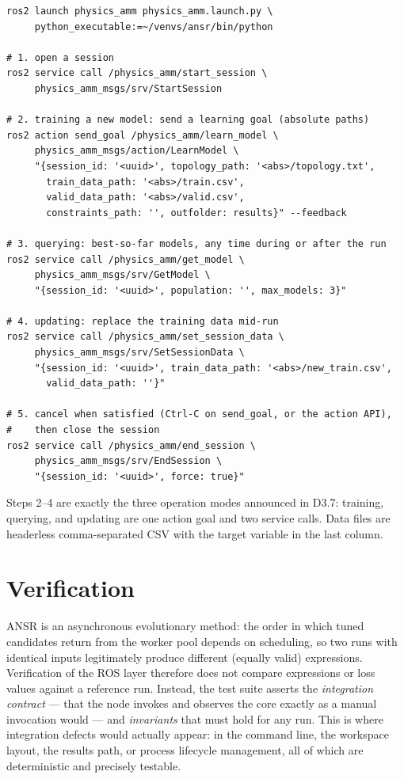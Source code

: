 \begin{lstlisting}[style=ros2shell, caption={A complete session from the
  command line.}, label={ros2:lst:cli}]
ros2 launch physics_amm physics_amm.launch.py \
     python_executable:=~/venvs/ansr/bin/python

# 1. open a session
ros2 service call /physics_amm/start_session \
     physics_amm_msgs/srv/StartSession

# 2. training a new model: send a learning goal (absolute paths)
ros2 action send_goal /physics_amm/learn_model \
     physics_amm_msgs/action/LearnModel \
     "{session_id: '<uuid>', topology_path: '<abs>/topology.txt',
       train_data_path: '<abs>/train.csv',
       valid_data_path: '<abs>/valid.csv',
       constraints_path: '', outfolder: results}" --feedback

# 3. querying: best-so-far models, any time during or after the run
ros2 service call /physics_amm/get_model \
     physics_amm_msgs/srv/GetModel \
     "{session_id: '<uuid>', population: '', max_models: 3}"

# 4. updating: replace the training data mid-run
ros2 service call /physics_amm/set_session_data \
     physics_amm_msgs/srv/SetSessionData \
     "{session_id: '<uuid>', train_data_path: '<abs>/new_train.csv',
       valid_data_path: ''}"

# 5. cancel when satisfied (Ctrl-C on send_goal, or the action API),
#    then close the session
ros2 service call /physics_amm/end_session \
     physics_amm_msgs/srv/EndSession \
     "{session_id: '<uuid>', force: true}"
\end{lstlisting}

Steps 2--4 are exactly the three operation modes announced in D3.7:
training, querying, and updating are one action goal and two service calls.
Data files are headerless comma-separated CSV with the target variable in
the last column.

\section{Verification}
\label{ros2:sec:verification}

ANSR is an asynchronous evolutionary method: the order in which tuned
candidates return from the worker pool depends on scheduling, so two runs
with identical inputs legitimately produce different (equally valid)
expressions. Verification of the ROS layer therefore does not compare
expressions or loss values against a reference run. Instead, the test suite
asserts the \emph{integration contract} --- that the node invokes and
observes the core exactly as a manual invocation would --- and
\emph{invariants} that must hold for any run. This is where integration
defects would actually appear: in the command line, the workspace layout,
the results path, or process lifecycle management, all of which are
deterministic and precisely testable.

